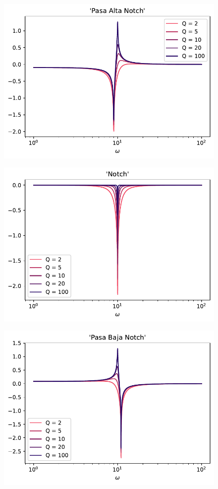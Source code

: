 \documentclass[11pt]{article} %
\begin{document}
\begin{figure}[h!] \centering
\includegraphics[scale=1]{Bode_4.pdf}
\end{figure}

\newpage

\begin{figure}[h!] \centering
\includegraphics[scale=1]{Bode_5.pdf}
\end{figure}

\begin{figure}[h!] \centering
\includegraphics[scale=1]{Bode_6.pdf}
\end{figure}
\end{document}
